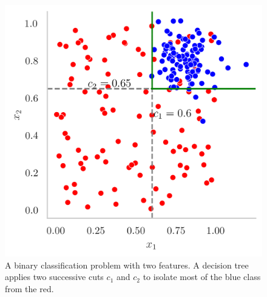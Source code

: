 \begin{figure}[h!]
    \center
    \begin{minipage}[c]{0.35\textwidth}
        \caption{A binary classification problem with two features. A decision tree applies two successive cuts $c_1$ and $c_2$ to isolate most of the blue class from the red.}\label{fig:tree-ex}
      \end{minipage}
      \begin{minipage}[c]{0.5\textwidth}
        \includegraphics[width=\textwidth]{Images/ML/scatterPlot.png}
      \end{minipage}
\end{figure}
    
